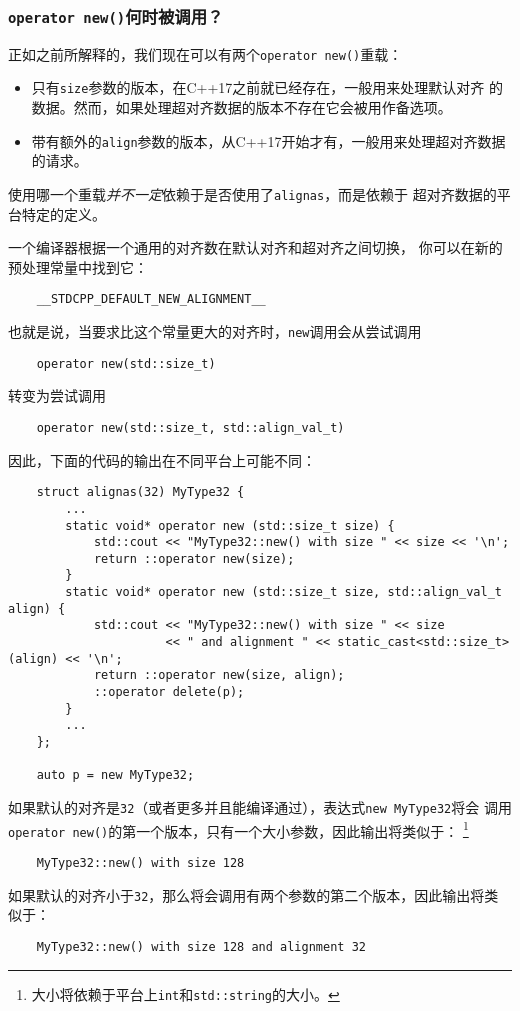 \subsubsection{\texttt{operator new()}何时被调用？}\label{ch30.2.2.1}
正如之前所解释的，我们现在可以有两个\texttt{operator new()}重载：
\begin{itemize}
    \item 只有\texttt{size}参数的版本，在C++17之前就已经存在，一般用来处理默认对齐
    的数据。然而，如果处理超对齐数据的版本不存在它会被用作备选项。
    \item 带有额外的\texttt{align}参数的版本，从C++17开始才有，一般用来处理超对齐数据的请求。
\end{itemize}
使用哪一个重载\emph{并不一定}依赖于是否使用了\texttt{alignas}，而是依赖于
超对齐数据的平台特定的定义。

一个编译器根据一个通用的对齐数在默认对齐和超对齐之间切换，
你可以在新的预处理常量中找到它：
\begin{lstlisting}
    __STDCPP_DEFAULT_NEW_ALIGNMENT__
\end{lstlisting}
也就是说，当要求比这个常量更大的对齐时，\texttt{new}调用会从尝试调用
\begin{lstlisting}
    operator new(std::size_t)
\end{lstlisting}
转变为尝试调用
\begin{lstlisting}
    operator new(std::size_t, std::align_val_t)
\end{lstlisting}
因此，下面的代码的输出在不同平台上可能不同：
\begin{lstlisting}
    struct alignas(32) MyType32 {
        ...
        static void* operator new (std::size_t size) {
            std::cout << "MyType32::new() with size " << size << '\n';
            return ::operator new(size);
        }
        static void* operator new (std::size_t size, std::align_val_t align) {
            std::cout << "MyType32::new() with size " << size
                      << " and alignment " << static_cast<std::size_t>(align) << '\n';
            return ::operator new(size, align);
            ::operator delete(p);
        }
        ...
    };

    auto p = new MyType32;
\end{lstlisting}
如果默认的对齐是\texttt{32}（或者更多并且能编译通过），表达式\texttt{new MyType32}将会
调用\texttt{operator new()}的第一个版本，只有一个大小参数，因此输出将类似于：
\footnote{大小将依赖于平台上\texttt{int}和\texttt{std::string}的大小。}
\begin{lstlisting}
    MyType32::new() with size 128
\end{lstlisting}
如果默认的对齐小于\texttt{32}，那么将会调用有两个参数的第二个版本，因此输出将类似于：
\begin{lstlisting}
    MyType32::new() with size 128 and alignment 32
\end{lstlisting}


